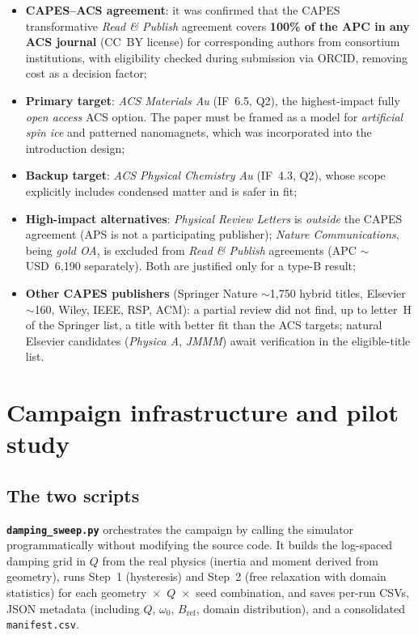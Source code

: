 \documentclass[11pt,a4paper]{article}
\newcommand{\code}[1]{\texttt{#1}}
\begin{document}
\begin{itemize}
\item \textbf{CAPES--ACS agreement}: it was confirmed that the CAPES transformative \emph{Read \& Publish} agreement covers \textbf{100\% of the APC in any ACS journal} (CC~BY license) for corresponding authors from consortium institutions, with eligibility checked during submission via ORCID, removing cost as a decision factor;
\item \textbf{Primary target}: \emph{ACS Materials Au} (IF~6.5, Q2), the highest-impact fully \emph{open access} ACS option. The paper must be framed as a model for \emph{artificial spin ice} and patterned nanomagnets, which was incorporated into the introduction design;
\item \textbf{Backup target}: \emph{ACS Physical Chemistry Au} (IF~4.3, Q2), whose scope explicitly includes condensed matter and is safer in fit;
\item \textbf{High-impact alternatives}: \emph{Physical Review Letters} is \emph{outside} the CAPES agreement (APS is not a participating publisher); \emph{Nature Communications}, being \emph{gold OA}, is excluded from \emph{Read \& Publish} agreements (APC $\sim$ USD~6,190 separately). Both are justified only for a type-B result;
\item \textbf{Other CAPES publishers} (Springer Nature $\sim$1,750 hybrid titles, Elsevier $\sim$160, Wiley, IEEE, RSP, ACM): a partial review did not find, up to letter~H of the Springer list, a title with better fit than the ACS targets; natural Elsevier candidates (\emph{Physica A}, \emph{JMMM}) await verification in the eligible-title list.
\end{itemize}

\section{Campaign infrastructure and pilot study}
\label{sec:campaign}

\subsection{The two scripts}

\textbf{\code{damping\_sweep.py}} orchestrates the campaign by calling the simulator programmatically without modifying the source code. It builds the log-spaced damping grid in $Q$ from the real physics (inertia and moment derived from geometry), runs Step~1 (hysteresis) and Step~2 (free relaxation with domain statistics) for each geometry~$\times$~$Q$~$\times$~seed combination, and saves per-run CSVs, JSON metadata (including $Q$, $\omega_0$, $B_{\mathrm{ref}}$, domain distribution), and a consolidated \code{manifest.csv}.
\end{document}
